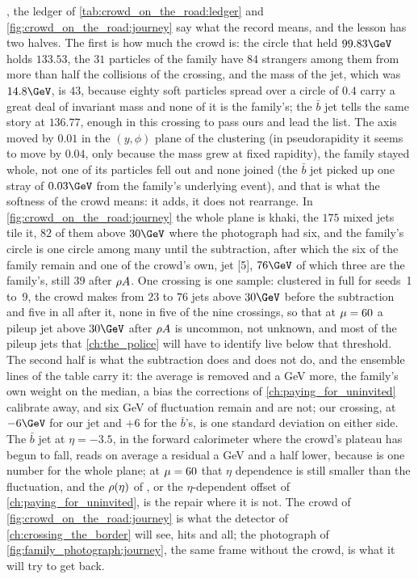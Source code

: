 , the ledger of
\cref{tab:crowd_on_the_road:ledger} and \cref{fig:crowd_on_the_road:journey}
say what the record means, and the
lesson has two halves. The first is how much the crowd is: the circle
that held $99.83\GeV$ holds $133.53$, the $31$ particles of the family
have $84$ strangers among them from more than half the collisions of the
crossing, and the mass of the jet, which was $14.8\GeV$, is $43$, because
eighty soft particles spread over a circle of $0.4$ carry a great deal of
invariant mass and none of it is the family's; the $\bar b$ jet tells the
same story at $136.77$, enough in this crossing to pass ours and lead the
list. The axis moved by $0.01$ in the $(y,\phi)$ plane of the clustering
(in pseudorapidity it seems to move by $0.04$, only because the mass grew
at fixed rapidity), the family stayed
whole, not one of its particles fell out and none joined (the $\bar b$
jet picked up one stray of $0.03\GeV$ from the family's underlying
event), and that is
what the softness of the crowd means: it adds, it does not rearrange. In
\cref{fig:crowd_on_the_road:journey} the whole plane is khaki, the $175$
mixed jets tile it, $82$ of them above $30\GeV$ where the photograph had
six, and the family's circle is one circle among many until the
subtraction, after which the six of the family remain and one of the
crowd's own, jet [5], $76\GeV$ of which three are the family's, still
$39$ after $\rho A$. One crossing is one sample: clustered in full for
seeds~1 to~9, the crowd makes from $23$ to $76$ jets above $30\GeV$
before the subtraction and five in all after it, none in five of the
nine crossings, so that at $\mu=60$ a pileup jet above $30\GeV$ after
$\rho A$ is uncommon, not unknown, and most of the pileup jets that
\cref{ch:the_police} will
have to identify live below that threshold. The second half is what the
subtraction does and does not do, and the ensemble lines of the table
carry it: the average is removed and a GeV more, the family's own weight
on the median, a bias the corrections of
\cref{ch:paying_for_uninvited} calibrate away, and six GeV of
fluctuation remain and are not; our crossing, at $-6\GeV$ for our jet
and $+6$ for the $\bar b$'s, is one standard deviation on either side.
The $\bar b$ jet at $\eta=-3.5$, in the
forward calorimeter where the crowd's plateau has begun to fall, reads
on average a residual a GeV and a half lower, because \rhoPU is one
number for the whole plane; at $\mu=60$ that $\eta$
dependence is still smaller than the fluctuation, and the
$\rho(\eta)$ of \cite{Cacciari:2009dp}, or the $\eta$-dependent offset
of \cref{ch:paying_for_uninvited}, is the repair where it is not. The
crowd of \cref{fig:crowd_on_the_road:journey} is what the detector of
\cref{ch:crossing_the_border} will see, hits and all; the photograph of
\cref{fig:family_photograph:journey}, the same frame without the crowd,
is what it will try to get back.

